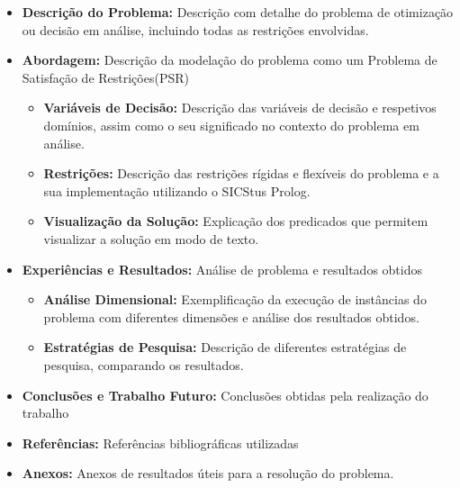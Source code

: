 \documentclass[11pt]{article}
\begin{document}
\begin{itemize}

\item \textbf{Descrição do Problema:} Descrição com detalhe do problema de
otimização ou decisão em análise, incluindo todas as restrições envolvidas.

\item \textbf{Abordagem:} Descrição da modelação do problema como um Problema de Satisfação de Restrições(PSR)

\begin{itemize}

\item \textbf{Variáveis de Decisão:}  Descrição das variáveis de decisão e
respetivos domínios, assim como o seu significado no contexto do problema em análise.

\item\textbf{ Restrições:} Descrição das restrições rígidas e flexíveis do problema e a
sua implementação utilizando o SICStus Prolog.

\item \textbf{Visualização da Solução:} Explicação dos predicados que permitem
visualizar a solução em modo de texto.

\end{itemize}


\item \textbf{Experiências e Resultados:} Análise de problema e resultados obtidos

\begin{itemize}

\item \textbf{Análise Dimensional:} Exemplificação da execução de instâncias do problema com
diferentes dimensões e análise dos resultados obtidos.

\item \textbf{Estratégias de Pesquisa:} Descrição de diferentes estratégias de pesquisa, comparando os resultados.

\end{itemize}


\item \textbf{Conclusões e Trabalho Futuro:} Conclusões obtidas pela realização do trabalho

\item \textbf{Referências:} Referências bibliográficas utilizadas

\item \textbf{Anexos:} Anexos de resultados úteis para a resolução do problema.

\end{itemize}
\end{document}
